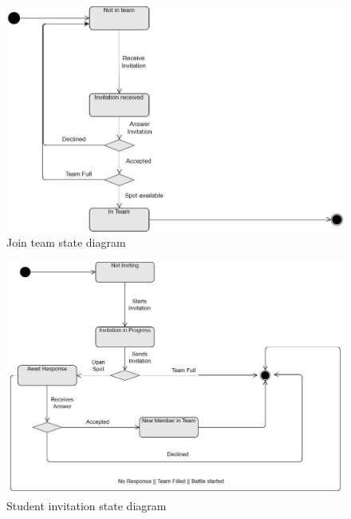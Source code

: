 \begin{figure}[H]
    \begin{center}
        \includegraphics[width=0.9\linewidth]{Images/student-join-team.jpg}
        \caption{Join team state diagram}
        \label{fig:state_diagram_4}%
    \end{center}
\end{figure}

\begin{figure}[H]
    \begin{center}
        \includegraphics[width=0.9\linewidth]{Images/student-invitation.jpg}
        \caption{Student invitation state diagram}
        \label{fig:state_diagram_5}%
    \end{center}
\end{figure}

